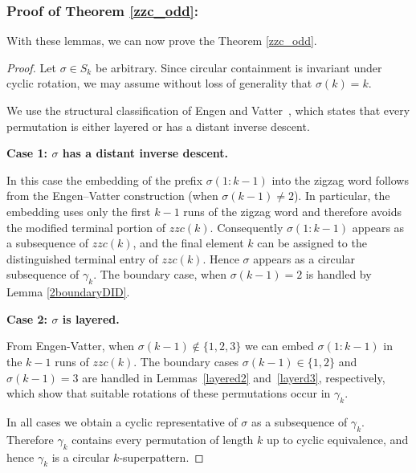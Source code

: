 \documentclass[a4paper,12pt]{article}
\theoremstyle{definition}
\numberwithin{equation}{section}
\begin{document}
\subsubsection*{ Proof of Theorem \ref{zzc_odd}:}
With these lemmas, we can now prove the Theorem \ref{zzc_odd}.
\begin{proof}
Let $\sigma \in S_k$ be arbitrary. Since circular containment is invariant 
under cyclic rotation, we may assume without loss of generality that 
$\sigma(k)=k$.

We use the structural classification of Engen and Vatter~\cite{engen2020containing}, 
which states that every permutation is either layered or has a distant 
inverse descent.

\medskip
\noindent
\textbf{Case 1: $\sigma$ has a distant inverse descent.}

In this case the embedding of the prefix $\sigma(1:k-1)$ into the zigzag 
word follows from the Engen--Vatter construction (when $\sigma(k-1) \neq 2$). 
In particular, the embedding uses only the first $k-1$ runs of the zigzag 
word and therefore avoids the modified terminal portion of $zzc(k)$. 
Consequently $\sigma(1:k-1)$ appears as a subsequence of $zzc(k)$, and 
the final element $k$ can be assigned to the distinguished terminal entry 
of $zzc(k)$. Hence $\sigma$ appears as a circular subsequence of $\gamma_k$. The boundary case, when $\sigma(k-1) = 2$ is handled by Lemma \ref{2boundaryDID}.

\medskip
\noindent
\textbf{Case 2: $\sigma$ is layered.}

From Engen-Vatter, when $\sigma(k-1) \notin \{ 1,2,3 \}$ we can embed $\sigma(1:k-1)$ in the $k-1$ runs of 
$zzc(k)$. 
The boundary cases $\sigma(k-1) \in \{1,2 \}$ and $\sigma(k-1)=3$ are handled 
in Lemmas~\ref{layered2} and~\ref{layerd3}, respectively, 
which show that suitable rotations of these permutations occur in 
$\gamma_k$.

\medskip
In all cases we obtain a cyclic representative of $\sigma$ as a subsequence 
of $\gamma_k$. Therefore $\gamma_k$ contains every permutation of length 
$k$ up to cyclic equivalence, and hence $\gamma_k$ is a circular 
$k$-superpattern.
\end{proof}
   
\end{document}
